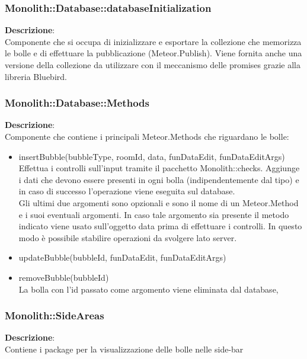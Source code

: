 \clearpage

\subsubsection{Monolith::Database::databaseInitialization}
\textbf{Descrizione}:\\
 Componente che si occupa di inizializzare e esportare la collezione che memorizza le bolle e di effettuare la pubblicazione (Meteor.Publish). Viene fornita anche una versione della collezione da utilizzare con il meccanismo delle promises grazie alla libreria Bluebird. 


\clearpage

\subsubsection{Monolith::Database::Methods}
\textbf{Descrizione}:\\
 Componente che contiene i principali Meteor.Methods  che riguardano le bolle:
\begin{itemize}
\item insertBubble(bubbleType, roomId, data, funDataEdit, funDataEditArgs) \\
Effettua i controlli sull'input tramite il pacchetto Monolith::checks. Aggiunge i dati che devono essere presenti in ogni bolla (indipendentemente dal tipo) e in caso di successo l'operazione viene eseguita sul database.\\
Gli ultimi due argomenti sono opzionali e sono il nome di un Meteor.Method e i suoi eventuali argomenti. In caso tale argomento sia presente il metodo indicato viene usato sull'oggetto data prima di effettuare i controlli. In questo modo è possibile stabilire operazioni da svolgere lato server.
\item updateBubble(bubbleId, funDataEdit, funDataEditArgs)\\
\item removeBubble(bubbleId) \\
La bolla con l'id passato come argomento viene eliminata dal database,
\end{itemize} 


\clearpage

\subsubsection{Monolith::SideAreas}
\textbf{Descrizione}:\\
 Contiene i package per la visualizzazione delle bolle nelle side-bar 


